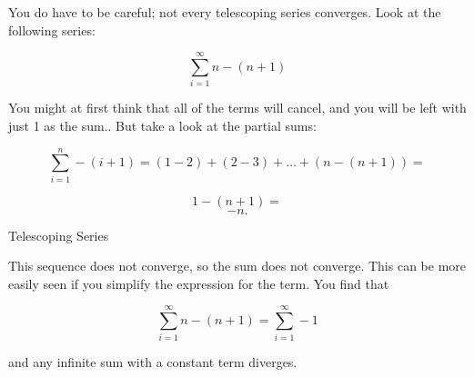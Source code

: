 


You do have to be careful; not every telescoping series converges. Look at the following series:

\[   \sum^{\infty}_{i=1} n - (n + 1) \]

You might at first think that all of the terms will cancel, and you will be left with just 1 as the sum.. But take a look at the partial sums:

\[   \sum^{n}_{i=1} - (i + 1) = (1 - 2) + (2 - 3) + \ldots + (n - (n + 1)) =\]

\[1 - (n + 1) =\]
\[-n.\]



	{Telescoping Series}
	
This sequence does not converge, so the sum does not converge. This can be more easily seen if you simplify the expression for the term. You find that

\[   \sum^{\infty}_{i=1} n - (n + 1) = \sum^{\infty}_{i=1} -1 \]

and any infinite sum with a constant term diverges.
	


